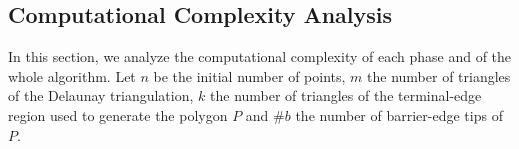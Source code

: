 \documentclass[pdflatex,sn-mathphys]{sn-jnl}%
\theoremstyle{thmstyleone}%
\theoremstyle{thmstyletwo}%
\theoremstyle{thmstylethree}%
\begin{document}







\subsection{Computational Complexity Analysis}
\label{sub:Complexity Analysis}

In this section, we analyze the computational complexity of each phase and of the whole algorithm. Let  $n$ be the initial number of points, $m$ the number of triangles of the Delaunay triangulation, $k$ the number of triangles of the terminal-edge region used to generate the polygon $P$ and $\#b$ the number of barrier-edge tips of $P$.  
\end{document}
